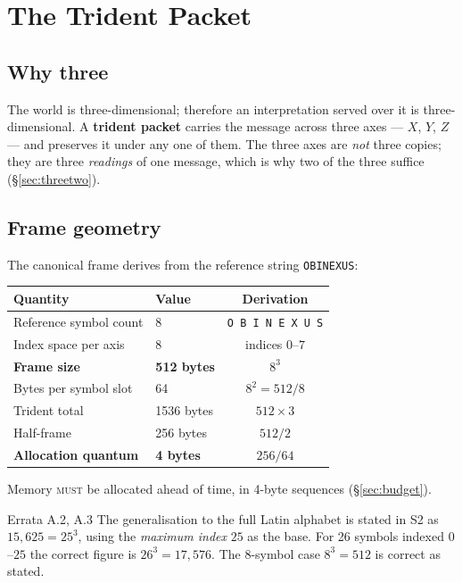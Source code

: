 \documentclass[11pt,a4paper]{article}
\newcommand{\MUST}{\textsc{must}}
\newcommand{\OBI}{\texttt{OBINEXUS}}
\begin{document}
\section{The Trident Packet}

\subsection{Why three}

The world is three-dimensional; therefore an interpretation served over it is
three-dimensional. A \textbf{trident packet} carries the message across three
axes --- $X$, $Y$, $Z$ --- and preserves it under any one of them. The three
axes are \emph{not} three copies; they are three \emph{readings} of one
message, which is why two of the three suffice (\S\ref{sec:threetwo}).

\subsection{Frame geometry}
\label{sec:frame}

The canonical frame derives from the reference string \OBI{}:

\begin{center}
\begin{tabular}{@{}llc@{}}
\toprule
\textbf{Quantity} & \textbf{Value} & \textbf{Derivation} \\
\midrule
Reference symbol count & 8 & \texttt{O B I N E X U S} \\
Index space per axis & 8 & indices $0$--$7$ \\
\textbf{Frame size} & \textbf{512 bytes} & $8^{3}$ \\
Bytes per symbol slot & 64 & $8^{2} = 512/8$ \\
Trident total & 1536 bytes & $512 \times 3$ \\
Half-frame & 256 bytes & $512/2$ \\
\textbf{Allocation quantum} & \textbf{4 bytes} & $256/64$ \\
\bottomrule
\end{tabular}
\end{center}

Memory \MUST{} be allocated ahead of time, in 4-byte sequences
(\S\ref{sec:budget}).

\begin{errata}{Errata A.2, A.3}
The generalisation to the full Latin alphabet is stated in S2 as $15{,}625 =
25^{3}$, using the \emph{maximum index} $25$ as the base. For 26 symbols
indexed $0$--$25$ the correct figure is $26^{3} = 17{,}576$. The 8-symbol case
$8^{3} = 512$ is correct as stated.
\end{errata}
\end{document}
